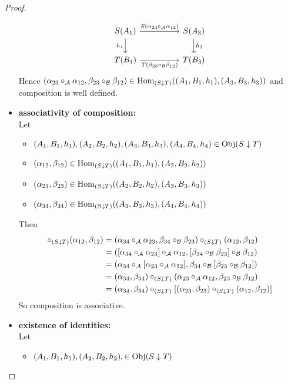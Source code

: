 \documentclass{book}
\begin{document}
\begin{proof}
\begin{itemize}
\[\begin{tikzcd}
				S(A_1) \arrow[rr, "S(\al_{23} \circ_{\MA} \al_{12})"] \arrow[d, "h_1"']&  & S(A_3)  \arrow[d, "h_3"] \\
				T(B_1) \arrow[rr, "T(\be_{23} \circ_{\MB} \be_{12})"']                       &  & T(B_3)
			\end{tikzcd}
			\]
			Hence $(\alpha_{23} \circ_{\mathcal{A}} \alpha_{12}, \beta_{23} \circ_{\mathcal{B}} \beta_{12}) \in \operatorname{Hom}_{(S \downarrow T)}((A_1, B_1, h_1), (A_3, B_3, h_3))$ and composition is well defined. \\
			\item \textbf{associativity of composition:} \\
			Let 
			\begin{itemize}
				\item $(A_1, B_1, h_1), (A_2, B_2, h_2), (A_3, B_3, h_3), (A_4, B_4, h_4) \in \operatorname{Obj}(S \downarrow T)$
				\item $(\alpha_{12}, \beta_{12}) \in \operatorname{Hom}_{(S \downarrow T)}((A_1, B_1, h_1), (A_2, B_2, h_2))$ 
				\item $(\alpha_{23}, \beta_{23}) \in \operatorname{Hom}_{(S \downarrow T)}((A_2, B_2, h_2), (A_3, B_3, h_3))$
				\item $(\alpha_{34}, \beta_{34}) \in \operatorname{Hom}_{(S \downarrow T)}((A_3, B_3, h_3), (A_4, B_4, h_4))$
			\end{itemize}
			Then 
			\begin{align*}
				[ (\al_{34}, \be_{34}) \circ_{(S \downarrow T)} (\al_{23}, \be_{23}) ] \circ_{(S \downarrow T)} (\al_{12}, \be_{12})
				& = (\al_{34} \circ_{\MA} \al_{23}, \be_{34} \circ_{\MB} \be_{23}) \circ_{(S \downarrow T)} (\al_{12}, \be_{12}) \\
				& = ([\al_{34} \circ_{\MA} \al_{23}] \circ_{\MA} \al_{12}, [\be_{34} \circ_{\MB} \be_{23}] \circ_{\MB} \be_{12}) \\
				& =  (\al_{34} \circ_{\MA} [\al_{23} \circ_{\MA} \al_{12}], \be_{34} \circ_{\MB} [\be_{23} \circ_{\MB} \be_{12}]) \\
				& = (\al_{34}, \be_{34}) \circ_{(S \downarrow T)} (\al_{23} \circ_{\MA} \al_{12}, \be_{23} \circ_{\MB} \be_{12}) \\
				& = (\al_{34}, \be_{34}) \circ_{(S \downarrow T)} [(\al_{23}, \be_{23}) \circ_{(S \downarrow T)} (\al_{12}, \be_{12})]
			\end{align*}
			So composition is associative. \\
			\item \textbf{existence of identities:} \\
			Let
			\begin{itemize}
				\item $(A_1, B_1, h_1), (A_2, B_2, h_2), \in \operatorname{Obj}(S \downarrow T)$

\end{itemize}
\end{itemize}
\end{proof}
\end{document}
